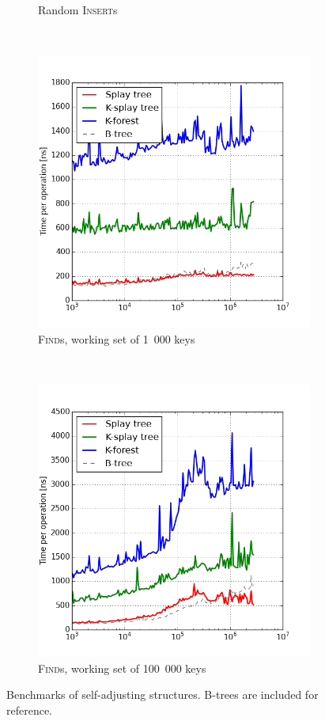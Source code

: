 \begin{figure}
\begin{subfigure}[b]{0.45\textwidth}
	\caption{Random \textsc{Insert}s}
\end{subfigure}
\\
\begin{subfigure}[b]{0.45\textwidth}
	\includegraphics[width=\textwidth]{img/performance/self-adj-ws-1k}
	\caption{\textsc{Find}s, working set of 1~000 keys}
\end{subfigure}
~
\begin{subfigure}[b]{0.45\textwidth}
	\includegraphics[width=\textwidth]{img/performance/self-adj-ws-100k}
	\caption{\textsc{Find}s, working set of 100~000 keys}
\end{subfigure}
\caption{Benchmarks of self-adjusting structures.
	B-trees are included for reference.}
\label{fig:self-adj-performance}
\end{figure}

